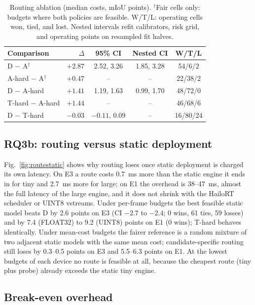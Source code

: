 \documentclass[a4paper,5p]{elsarticle}
\newcommand{\miou}{mIoU}
\begin{document}
\begin{table}[t]
\centering
\caption{Routing ablation (median costs, \miou{} points). $^{\dagger}$Fair cells only: budgets where both policies are feasible. W/T/L: operating cells won, tied, and lost. Nested intervals refit calibrators, risk grid, and operating points on resampled fit halves.}
\label{tab:ablation}
\footnotesize
\setlength{\tabcolsep}{3pt}
\begin{tabular*}{\linewidth}{@{\extracolsep{\fill}}lrccc@{}}
\toprule
Comparison & $\Delta$ & 95\% CI & Nested CI & W/T/L \\
\midrule
D $-$ A$^{\dagger}$ & $+2.87$ & 2.52, 3.26 & 1.85, 3.28 & 54/6/2 \\
A-hard $-$ A$^{\dagger}$ & $+0.47$ & -- & -- & 22/38/2 \\
D $-$ A-hard & $+1.41$ & 1.19, 1.63 & 0.99, 1.70 & 48/72/0 \\
T-hard $-$ A-hard & $+1.44$ & -- & -- & 46/68/6 \\
D $-$ T-hard & $-0.03$ & $-0.11$, 0.09 & -- & 16/80/24 \\
\bottomrule
\end{tabular*}
\end{table}

\subsection{RQ3b: routing versus static deployment}

Fig.~\ref{fig:routestatic} shows why routing loses once static deployment is charged its own latency. On E3 a route costs 0.7~ms more than the static engine it ends in for tiny and 2.7~ms more for large; on E1 the overhead is 38--47~ms, almost the full latency of the large engine, and it does not shrink with the HailoRT scheduler or UINT8 vstreams. Under per-frame budgets the best feasible static model beats D by 2.6 points on E3 (CI $-2.7$ to $-2.4$; 0 wins, 61 ties, 59 losses) and by 7.4 (FLOAT32) to 9.2 (UINT8) points on E1 (0 wins); T-hard behaves identically. Under mean-cost budgets the fairer reference is a random mixture of two adjacent static models with the same mean cost; candidate-specific routing still loses by 0.3--0.5 points on E3 and 5.5--6.3 points on E1. At the lowest budgets of each device no route is feasible at all, because the cheapest route (tiny plus probe) already exceeds the static tiny engine.

\subsection{Break-even overhead}
\end{document}
